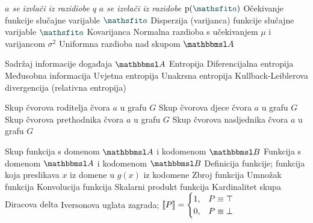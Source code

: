  {\textit{$a$ se izvlači iz razidiobe $q$}}
 {\textit{$a$ se izvlači iz razidobe $\p(\rvar a)$}}
 {Očekivanje funkcije slučajne varijable $\rvar a$}
 {Disperzija (varijanca) funkcije slučajne varijable $\rvar a$}
		{Kovarijanca}
 {Normalna razdioba s učekivanjem $\mu$ i varijancom $\sigma^2$}
	{Uniformna razdioba nad skupom $\set A$}

	{Sadržaj informacije događaja $\set A$}
	{Entropija}
	{Diferencijalna entropija}
	{Međusobna informacija}
	{Uvjetna entropija}
	{Unakrsna entropija}
	{Kullback-Leiblerova divergencija (relativna entropija)}

	{Skup čvorova roditelja čvora $a$ u grafu $G$}
	{Skup čvorova djece čvora $a$ u grafu $G$}
	{Skup čvorova prethodnika čvora $a$ u grafu $G$}
	{Skup čvorova nasljednika čvora $a$ u grafu $G$}

	{Skup funkcija s domenom $\set A$ i kodomenom $\set B$}
	{Funkcija s domenom $\set A$ i kodomenom $\set B$}
	{Definicija funkcije; funkcija koja preslikava $x$ iz domene u $g(x)$ iz kodomene}
	{Zbroj funkcija}
	{Umnožak funkcija}
	{Konvolucija funkcija}
	{Skalarni produkt funkcija}
	{Kardinalitet skupa}
	{Diracova delta}
	{Iversonova uglata zagrada; $\enbbracket{P}=\begin{cases} 1, & P \equiv \top \\ 0, & P \equiv \bot \end{cases}$}

